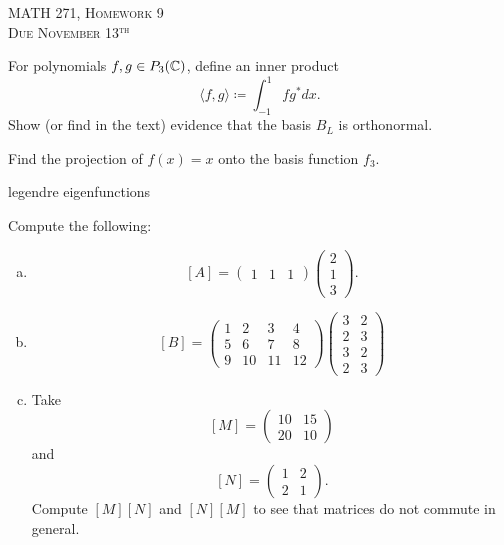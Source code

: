 \documentclass[12pt]{article} %
\begin{document}
\begin{center}
   \textsc{\large MATH 271, Homework 9}\\
   \textsc{Due November 13$^\textrm{th}$}
\end{center}
\vspace{.5cm}

    \item For polynomials $f,g\in P_3(\mathbb{C})$, define an inner product
    \[
\langle f,g\rangle \coloneqq \int_{-1}^1 fg^* dx.
\]
    Show (or find in the text) evidence that the basis $B_L$ is orthonormal.
    \item Find the projection of $f(x)=x$ onto the basis function $f_3$.

legendre eigenfunctions

\begin{problem}
Compute the following:
\begin{enumerate}[(a)]
    \item
    \[
    [A]=\begin{pmatrix} 1& 1& 1 \end{pmatrix}
    \begin{pmatrix} 2\\ 1\\ 3 \end{pmatrix}.
    \]
    \item
    \[
    [B]=\begin{pmatrix} 1& 2& 3& 4\\ 5& 6& 7& 8\\ 9& 10& 11& 12\end{pmatrix}
    \begin{pmatrix} 3& 2\\ 2& 3\\ 3& 2\\ 2& 3\end{pmatrix}
    \]
    \item Take
    \[
    [M]=\begin{pmatrix} 10& 15\\ 20& 10 \end{pmatrix}
    \]
    and
    \[
    [N]=\begin{pmatrix} 1 & 2\\ 2& 1\end{pmatrix}.
    \]
    Compute $[M][N]$ and $[N][M]$ to see that matrices do not commute in general.
\end{enumerate}
\end{problem}
\end{document}
